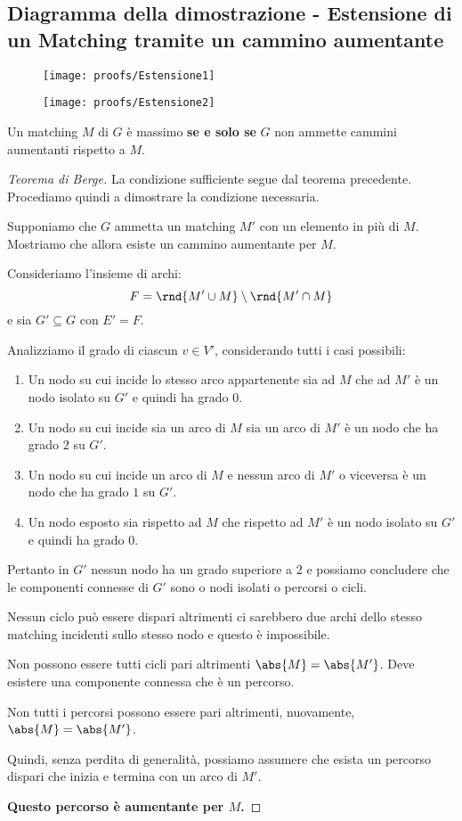 \documentclass[\main/main.tex]{subfiles}
\begin{document}
\subsection{Diagramma della dimostrazione - Estensione di un Matching tramite un cammino aumentante}
\begin{figure}
	\texttt{[image: proofs/Estensione1]}
\end{figure}
\begin{figure}
	\texttt{[image: proofs/Estensione2]}
\end{figure}
\clearpage
\begin{theorem}
	Un matching \(M\) di \(G\) è massimo \textbf{se e solo se} \(G\) non ammette cammini aumentanti rispetto a \(M\).
\end{theorem}
\begin{proof}[Teorema di Berge]
	La condizione sufficiente segue dal teorema precedente. Procediamo quindi a dimostrare la condizione necessaria.

	Supponiamo che \(G\) ammetta un matching \(M'\) con un elemento in più di \(M\). Mostriamo che allora esiste un cammino aumentante per \(M\).

	Consideriamo l'insieme di archi:
	\[
		F = \rnd{M'\cup M}\setminus\rnd{M' \cap M}
	\]
	e sia \(G' \subseteq G\) con \(E' = F\).

	Analizziamo il grado di ciascun \(v \in V'\), considerando tutti i casi possibili:
	\begin{enumerate}
		\item Un nodo su cui incide lo stesso arco appartenente sia ad \(M\) che ad \(M'\) è un nodo isolato su \(G'\) e quindi ha grado \(0\).
		\item Un nodo su cui incide sia un arco di \(M\) sia un arco di \(M'\) è un nodo che ha grado \(2\) su \(G'\).
		\item Un nodo su cui incide un arco di \(M\) e nessun arco di \(M'\) o viceversa è un nodo che ha grado \(1\) su \(G'\).
		\item Un nodo esposto sia rispetto ad \(M\) che rispetto ad \(M'\) è un nodo isolato su \(G'\) e quindi ha grado \(0\).
	\end{enumerate}
	Pertanto in \(G'\) nessun nodo ha un grado superiore a 2 e possiamo concludere che le componenti connesse di \(G'\) sono o nodi isolati o percorsi o cicli.

	Nessun ciclo può essere dispari altrimenti ci sarebbero due archi dello stesso matching incidenti sullo stesso nodo e questo è impossibile.

	Non possono essere tutti cicli pari altrimenti \(\abs{M} = \abs{M'}\). Deve esistere una componente connessa che è un percorso.

	Non tutti i percorsi possono essere pari altrimenti, nuovamente, \(\abs{M} = \abs{M'}\).

	Quindi, senza perdita di generalità, possiamo assumere che esista un percorso dispari che inizia e termina con un arco di \(M'\).

	\textbf{Questo percorso è aumentante per \(M\).}
\end{proof}
\clearpage
\end{document}
